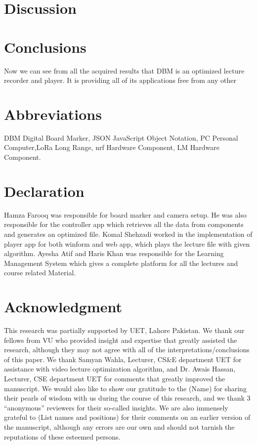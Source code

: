 \documentclass[conference]{IEEEtran}
\begin{document}
\section{Discussion}
\section{Conclusions}
Now we can see from all the acquired results that DBM is an optimized lecture recorder and player. It is providing all of its applications free from any other 
\section{Abbreviations}
DBM Digital Board Marker, JSON JavaScript Object Notation, PC Personal Computer,LoRa Long Range, nrf Hardware Component, LM Hardware Component.
\section{Declaration}
Hamza Farooq was responsible for board marker and camera setup. He was also responsible for the controller app which retrieves all the data from components and generates an optimized file. Komal Shehzadi worked in the implementation of player app for both winform and web app, which plays the lecture file with given algorithm. Ayesha Atif and Haris Khan was responsible for the Learning Management System which gives a complete platform for all the lectures and course related Material.
\section{Acknowledgment}
This research was partially supported by UET, Lahore Pakistan. We thank our fellows from VU who provided insight and expertise that greatly assisted the research, although they may not agree with all of the interpretations/conclusions of this paper.
We thank Samyan Wahla, Lecturer, CS\&E department UET for assistance with video lecture optimization algorithm, and Dr. Awais Hassan, Lecturer, CSE department UET for comments that greatly improved the manuscript.
We would also like to show our gratitude to the (Name) for sharing their pearls of wisdom with us during the course of this research, and we thank 3 “anonymous” reviewers for their so-called insights. We are also immensely grateful to (List names and positions) for their comments on an earlier version of the manuscript, although any errors are our own and should not tarnish the reputations of these esteemed persons.
\end{document}
